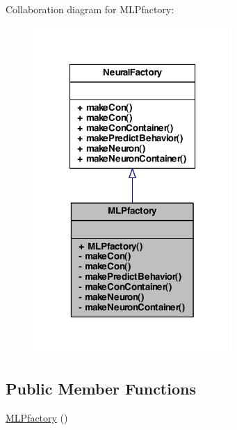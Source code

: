 Collaboration diagram for MLPfactory:
\nopagebreak
\begin{figure}[H]
\begin{center}
\leavevmode
\includegraphics[width=214pt]{class_m_l_pfactory__coll__graph}
\end{center}
\end{figure}
\subsection*{Public Member Functions}
\begin{DoxyCompactItemize}
\item 
\hyperlink{class_m_l_pfactory_a61dfce37d0344c58e275e8508b0a474c}{MLPfactory} ()
\end{DoxyCompactItemize}
